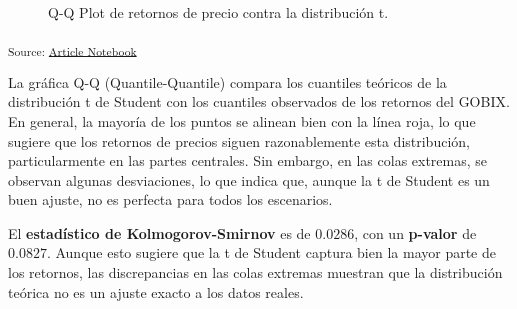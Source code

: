 \documentclass[
  number,
  preprint,
  3p,
  onecolumn]{elsarticle}
\begin{document}
\begin{figure}[H]


\caption{\label{fig-tqq-plot}Q-Q Plot de retornos de precio contra la
distribución t.}

\end{figure}%

\textsubscript{Source:
\href{https://iancont.github.io/fixed_income_garch/index.qmd.html}{Article
Notebook}}

La gráfica Q-Q (Quantile-Quantile) compara los cuantiles teóricos de la
distribución t de Student con los cuantiles observados de los retornos
del GOBIX. En general, la mayoría de los puntos se alinean bien con la
línea roja, lo que sugiere que los retornos de precios siguen
razonablemente esta distribución, particularmente en las partes
centrales. Sin embargo, en las colas extremas, se observan algunas
desviaciones, lo que indica que, aunque la t de Student es un buen
ajuste, no es perfecta para todos los escenarios.

El \textbf{estadístico de Kolmogorov-Smirnov} es de \(0.0286\), con un
\textbf{p-valor} de \(0.0827\). Aunque esto sugiere que la t de Student
captura bien la mayor parte de los retornos, las discrepancias en las
colas extremas muestran que la distribución teórica no es un ajuste
exacto a los datos reales.
\end{document}
